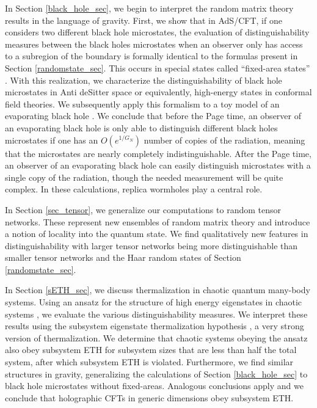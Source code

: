 \documentclass[a4paper,11pt]{article}
\newcommand*{\JKF}[1]{\textcolor{blue}{[JKF: #1]}}
\newcommand*{\SR}[1]{\textcolor{magenta}{[SR: \textsf{#1}]}}
\begin{document}
In Section \ref{black_hole_sec}, we begin to interpret the random matrix theory results in the language of gravity. First, we show that in AdS/CFT, if one considers two different black hole microstates, the evaluation of distinguishability measures between the black holes microstates
when an observer only has access to a subregion of the boundary is formally identical to the formulas present in Section \ref{randomstate_sec}. This occurs in special states called ``fixed-area states'' \cite{2019JHEP...10..240D,2019JHEP...05..052A}. 
With this realization, we characterize the distinguishability of black hole microstates in Anti deSitter space or equivalently, high-energy states in conformal field theories. We subsequently apply this formalism to a toy model of an evaporating black hole \cite{2019arXiv191111977P}.
We conclude that before the Page time, an observer of an evaporating black hole is only able to distinguish different black holes microstates
if one has an $O(e^{1/G_N})$ number of copies of the radiation, meaning that
the microstates are nearly completely indistinguishable. After the Page time, an observer of an evaporating black hole can easily distinguish microstates with a single copy of the radiation, though the needed measurement will be quite complex. In these calculations, replica wormholes play a central role.


In Section \ref{sec_tensor}, we generalize our computations to random tensor networks. These represent new ensembles of random matrix theory and introduce a notion of locality into the quantum state. We find qualitatively new features in distinguishability with larger tensor networks being more distinguishable than smaller tensor networks and the Haar random states of Section \ref{randomstate_sec}.

In Section \ref{sETH_sec}, we discuss thermalization in chaotic quantum many-body systems. Using an ansatz for the structure of high energy eigenstates in chaotic systems \cite{2010NJPh...12g5021D,2019PhRvE.100b2131M,2017arXiv170908784L}, 
we evaluate the various distinguishability measures. We interpret these results using the subsystem eigenstate thermalization hypothesis \cite{2018PhRvE..97a2140D}, a very strong version of thermalization. We determine that chaotic systems obeying the ansatz also obey subsystem ETH for subsystem sizes that are less than
half the total system, 
after which subsystem ETH is violated. Furthermore, we find similar structures in gravity, generalizing the calculations of Section \ref{black_hole_sec} to black hole microstates without fixed-areas. Analogous conclusions apply and we conclude that holographic CFTs in generic dimensions obey subsystem ETH.
\end{document}
